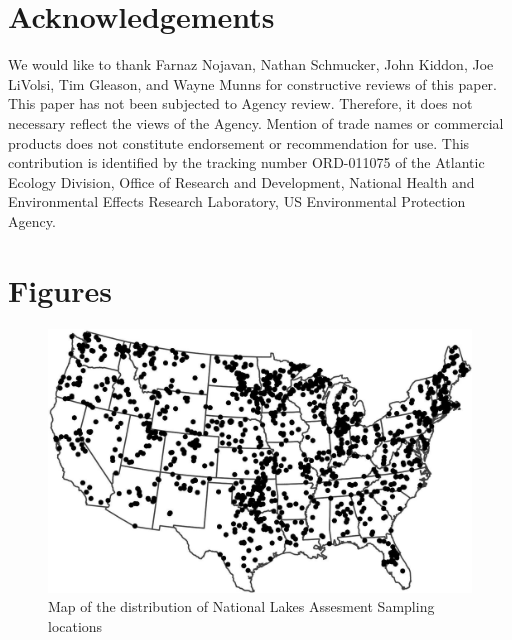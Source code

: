 \documentclass[11pt,]{article}
\begin{document}
\section{Acknowledgements}\label{acknowledgements}

We would like to thank Farnaz Nojavan, Nathan Schmucker, John Kiddon,
Joe LiVolsi, Tim Gleason, and Wayne Munns for constructive reviews of
this paper. This paper has not been subjected to Agency review.
Therefore, it does not necessary reflect the views of the Agency.
Mention of trade names or commercial products does not constitute
endorsement or recommendation for use. This contribution is identified
by the tracking number ORD-011075 of the Atlantic Ecology Division,
Office of Research and Development, National Health and Environmental
Effects Research Laboratory, US Environmental Protection Agency.

\newpage

\section{Figures}\label{figures}

\begin{figure}[htbp]
\centering
\includegraphics{manuscript_files/figure-latex/fig1_nlaMap-1.jpeg}
\caption{Map of the distribution of National Lakes Assesment Sampling
locations \label{fig:nlaMap}}
\end{figure}

\newpage
\end{document}
